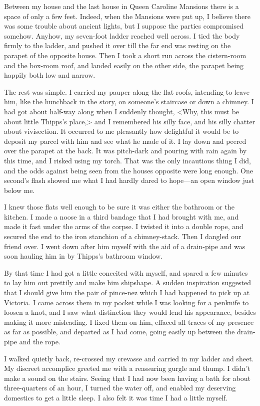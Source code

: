 Between my house and the last house in Queen Caroline Mansions there is a space of only a few feet. Indeed, when the Mansions were put up, I believe there was some trouble about ancient lights, but I suppose the parties compromised somehow. Anyhow, my seven-foot ladder reached well across. I tied the body firmly to the ladder, and pushed it over till the far end was resting on the parapet of the opposite house. Then I took a short run across the cistern-room and the box-room roof, and landed easily on the other side, the parapet being happily both low and narrow.

The rest was simple. I carried my pauper along the flat roofs, intending to leave him, like the hunchback in the story, on someone's staircase or down a chimney. I had got about half-way along when I suddenly thought, <Why, this must be about little Thipps's place,> and I remembered his silly face, and his silly chatter about vivisection. It occurred to me pleasantly how delightful it would be to deposit my parcel with him and see what he made of it. I lay down and peered over the parapet at the back. It was pitch-dark and pouring with rain again by this time, and I risked using my torch. That was the only incautious thing I did, and the odds against being seen from the houses opposite were long enough. One second's flash showed me what I had hardly dared to hope—an open window just below me.

I knew those flats well enough to be sure it was either the bathroom or the kitchen. I made a noose in a third bandage that I had brought with me, and made it fast under the arms of the corpse. I twisted it into a double rope, and secured the end to the iron stanchion of a chimney-stack. Then I dangled our friend over. I went down after him myself with the aid of a drain-pipe and was soon hauling him in by Thipps's bathroom window.

By that time I had got a little conceited with myself, and spared a few minutes to lay him out prettily and make him shipshape. A sudden inspiration suggested that I should give him the pair of pince-nez which I had happened to pick up at Victoria. I came across them in my pocket while I was looking for a penknife to loosen a knot, and I saw what distinction they would lend his appearance, besides making it more misleading. I fixed them on him, effaced all traces of my presence as far as possible, and departed as I had come, going easily up between the drain-pipe and the rope.

I walked quietly back, re-crossed my crevasse and carried in my ladder and sheet. My discreet accomplice greeted me with a reassuring gurgle and thump. I didn't make a sound on the stairs. Seeing that I had now been having a bath for about three-quarters of an hour, I turned the water off, and enabled my deserving domestics to get a little sleep. I also felt it was time I had a little myself.

